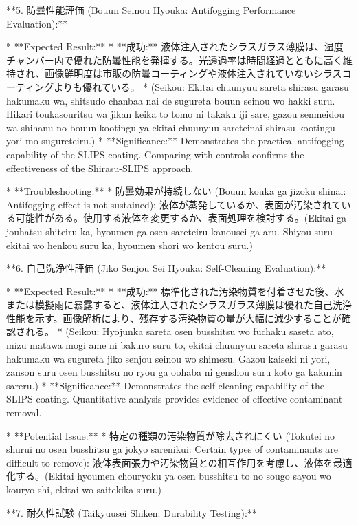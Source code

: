\documentclass{article}
\begin{document}
**5. 防曇性能評価 (Bouun Seinou Hyouka: Antifogging Performance Evaluation):**

*   **Expected Result:**
    *   **成功:** 液体注入されたシラスガラス薄膜は、湿度チャンバー内で優れた防曇性能を発揮する。光透過率は時間経過とともに高く維持され、画像鮮明度は市販の防曇コーティングや液体注入されていないシラスコーティングよりも優れている。
    *   (Seikou: Ekitai chuunyuu sareta shirasu garasu hakumaku wa, shitsudo chanbaa nai de sugureta bouun seinou wo hakki suru. Hikari toukasouritsu wa jikan keika to tomo ni takaku iji sare, gazou senmeidou wa shihanu no bouun kootingu ya ekitai chuunyuu sareteinai shirasu kootingu yori mo sugureteiru.)
    *   **Significance:**  Demonstrates the practical antifogging capability of the SLIPS coating. Comparing with controls confirms the effectiveness of the Shirasu-SLIPS approach.

*   **Troubleshooting:**
    *   防曇効果が持続しない (Bouun kouka ga jizoku shinai: Antifogging effect is not sustained): 液体が蒸発しているか、表面が汚染されている可能性がある。使用する液体を変更するか、表面処理を検討する。(Ekitai ga jouhatsu shiteiru ka, hyoumen ga osen sareteiru kanousei ga aru. Shiyou suru ekitai wo henkou suru ka, hyoumen shori wo kentou suru.)

**6. 自己洗浄性評価 (Jiko Senjou Sei Hyouka: Self-Cleaning Evaluation):**

*   **Expected Result:**
    *   **成功:** 標準化された汚染物質を付着させた後、水または模擬雨に暴露すると、液体注入されたシラスガラス薄膜は優れた自己洗浄性能を示す。画像解析により、残存する汚染物質の量が大幅に減少することが確認される。
    *   (Seikou: Hyojunka sareta osen busshitsu wo fuchaku saseta ato, mizu matawa mogi ame ni bakuro suru to, ekitai chuunyuu sareta shirasu garasu hakumaku wa sugureta jiko senjou seinou wo shimesu. Gazou kaiseki ni yori, zanson suru osen busshitsu no ryou ga oohaba ni genshou suru koto ga kakunin sareru.)
    *   **Significance:**  Demonstrates the self-cleaning capability of the SLIPS coating.  Quantitative analysis provides evidence of effective contaminant removal.

*   **Potential Issue:**
    *   特定の種類の汚染物質が除去されにくい (Tokutei no shurui no osen busshitsu ga jokyo sarenikui:  Certain types of contaminants are difficult to remove):  液体表面張力や汚染物質との相互作用を考慮し、液体を最適化する。(Ekitai hyoumen chouryoku ya osen busshitsu to no sougo sayou wo kouryo shi, ekitai wo saitekika suru.)

**7. 耐久性試験 (Taikyuusei Shiken: Durability Testing):**
\end{document}
